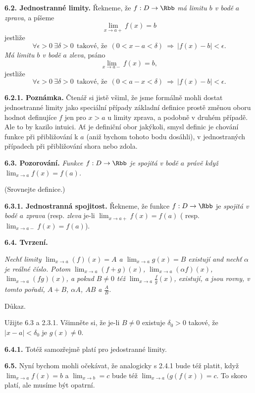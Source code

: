 \documentclass[12pt]{article}
\begin{document}
{\bigskip

{\bf 6.2. Jednostranné limity.} Řekneme, že $f:D\to\Rbb$ {\em má limitu $b$  v bodě} $a$ {\em zprava}, a píšeme
$$
\lim_{x\to a+}f(x)= b
$$
jestliže
 $$
 \forall \epsilon>0\ \exists \delta>0\ \ \text{takové, že}\ \ (0< x-a<\delta)\ \Rightarrow\ |f(x)-b|<\epsilon.
$$
{\em Má limitu $b$  v bodě} $a$ {\em zleva}, psáno
$$
\lim_{x\to a-}f(x)= b,
$$
jestliže
 $$
 \forall \epsilon>0\ \exists \delta>0\ \ \text{takové, že}\ \ (0< a-x<\delta)\ \Rightarrow\ |f(x)-b|<\epsilon.
$$

\medskip

{\bf 6.2.1. Poznámka.} Čtenář si jistě všiml, že jsme formálně mohli dostat jednostranné limity jako speciální případy základní definice prostě změnou oboru hodnot definujíce 
$f$ jen pro $x>a$ u limity zprava, a podobně v druhém případě. Ale to by kazilo intuici. Ať je definiční obor jakýkoli, smysl definic je chování funkce při přibližování k $a$ (aniž bychom tohoto bodu dosáhli), v jednostraných případech při přibližování shora nebo zdola.

\bigskip

{\bf 6.3. Pozorování.} {\em Funkce $f:D\to\Rbb$ je spojitá v bodě $a$ právě když $\lim_{x\to a}f(x)= f(a)$.}

(Srovnejte definice.)

\medskip

{\bf 6.3.1. Jednostranná spojitost.} Řekneme, že funkce $f:D\to\Rbb$  je  {\em spojitá v bodě $a$ zprava} (resp.  {\em zleva} je-li $\lim_{x\to a+}f(x)= f(a)$ ( resp. $\lim_{x\to a-}f(x)= f(a)$).

\bigskip

{\bf 6.4. Tvrzení.} {\em Nechť limity $\lim_{x\to a}(f)(x)=A$ a  $\lim_{x\to a}g(x)=B$ existují and nechť
$\alpha$ je reálné číslo. Potom $\lim_{x\to a}(f+g)(x)$, $\lim_{x\to a}(\alpha f)(x)$, $\lim_{x\to a}(fg)(x)$, a pokud $B\neq 0$ též $\lim_{x\to a}\frac{f}{g}(x)$, existují, a jsou rovny, v tomto pořadí, $A+B$, $\alpha A$, $AB$ a $\frac{A}{B}$.

Důkaz.} Užijte 6.3 a 2.3.1. Všimněte si, že je-li $B\neq 0$ existuje $\delta_0>0$ takové, že $|x-a|<\delta_0$ je $g(x)\neq 0$. \sq

\medskip

{\bf 6.4.1.} Totéž samozřejmě platí pro jedostranné limity.

\bigskip

{\bf 6.5.} Nyní bychom mohli očekávat, že analogicky s 2.4.1 bude též platit,  když
 $\lim_{x\to a}f(x)=b$ a $\lim_{x\to b}=c$ bude též $\lim_{x\to a}(g(f(x))=c$.
To skoro platí, ale musíme být opatrní.

}
\end{document}
